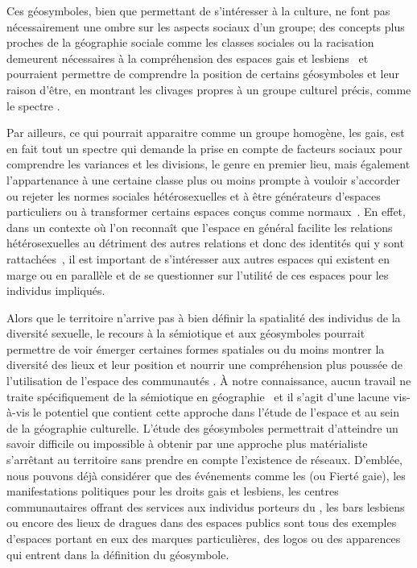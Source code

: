 Ces géosymboles, bien que permettant de s'intéresser à la culture, ne font pas nécessairement une ombre sur les aspects sociaux d'un groupe; des concepts plus proches de la géographie sociale comme les classes sociales ou la racisation~\citep{Bonniol2005} demeurent nécessaires à la compréhension des espaces gais et lesbiens~\citep[93]{Oswin2008} et pourraient permettre de comprendre la position de certains géosymboles et leur raison d'être, en montrant les clivages propres à un groupe culturel précis, comme le spectre \lgbt{}.

Par ailleurs, ce qui pourrait apparaitre comme un groupe homogène, les gais, est en fait tout un spectre qui demande la prise en compte de facteurs sociaux pour comprendre les variances et les divisions, le genre en premier lieu, mais également l'appartenance à une certaine classe plus ou moins prompte à vouloir s'accorder ou rejeter les normes sociales hétérosexuelles et à être générateurs d'espaces particuliers ou à transformer certains espaces conçus comme normaux~\citep{Lewis2011}. 
En effet, dans un contexte où l'on reconnaît que l'espace en général facilite les relations hétérosexuelles au détriment des autres relations et donc des identités qui y sont rattachées~\citep{Brown2003}, il est important de s'intéresser aux autres espaces qui existent en marge ou en parallèle et de se questionner sur l'utilité de ces espaces pour les individus impliqués.

Alors que le territoire n'arrive pas à bien définir la spatialité des individus de la diversité sexuelle, le recours à la sémiotique et aux géosymboles pourrait permettre de voir émerger certaines formes spatiales ou du moins montrer la diversité des lieux et leur position et nourrir une compréhension plus poussée de l'utilisation de l'espace des communautés \lgbt{}. 
À notre connaissance, aucun travail ne traite spécifiquement de la sémiotique en géographie \qu\ et il s'agit d'une lacune vis-à-vis le potentiel que contient cette approche dans l'étude de l'espace et au sein de la géographie culturelle.
L'étude des géosymboles permettrait d'atteindre un savoir difficile ou impossible à obtenir par une approche plus matérialiste s'arrêtant au territoire sans prendre en compte l'existence de réseaux. 
D'emblée, nous pouvons déjà considérer que des événements comme les  (ou Fierté gaie), les manifestations politiques pour les droits gais et lesbiens, les centres communautaires offrant des services aux individus porteurs du \vih, les bars lesbiens ou encore des lieux de dragues dans des espaces publics sont tous des exemples d'espaces \lgbt{} portant en eux des marques particulières, des logos ou des apparences qui entrent dans la définition du géosymbole.

